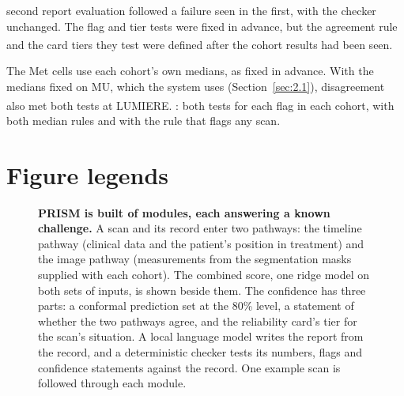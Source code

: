 \documentclass[largeformat]{interact} %
\newcommand{\expl}{\textsuperscript{\textdagger}}
\begin{document}
\begin{table}[!htbp]
\begin{threeparttable}
\begin{tablenotes}
second report evaluation followed a failure seen in the first, with the checker unchanged. The flag and tier tests
were fixed in advance, but the agreement rule and the card tiers they test were defined after the cohort results had
been seen\expl.
\item[a] The Met cells use each cohort's own medians, as fixed in advance. With the medians fixed on MU, which the
system uses (Section~\ref{sec:2.1}), disagreement also met both tests at LUMIERE\expl. : both tests for each flag in each cohort, with both median rules and with the rule that flags any scan.
\end{tablenotes}
\end{threeparttable}
\end{table}

\clearpage
\section*{Figure legends}

\begin{figure}[!htbp]
\centering
{}
\caption{\textbf{PRISM is built of modules, each answering a known challenge.} A scan and its record enter two
pathways: the timeline pathway (clinical data and the patient's position in treatment) and the image pathway
(measurements from the segmentation masks supplied with each cohort). The combined score, one ridge model on both
sets of inputs, is shown beside them. The confidence has three parts:
a conformal prediction set at the 80\% level, a statement of whether the two pathways agree, and the reliability
card's tier for the scan's situation. A local language model writes the report from the record, and a deterministic
checker tests its numbers, flags and confidence statements against the record. One example scan is followed through
each module.}
\label{fig:1}
\end{figure}
\end{document}
